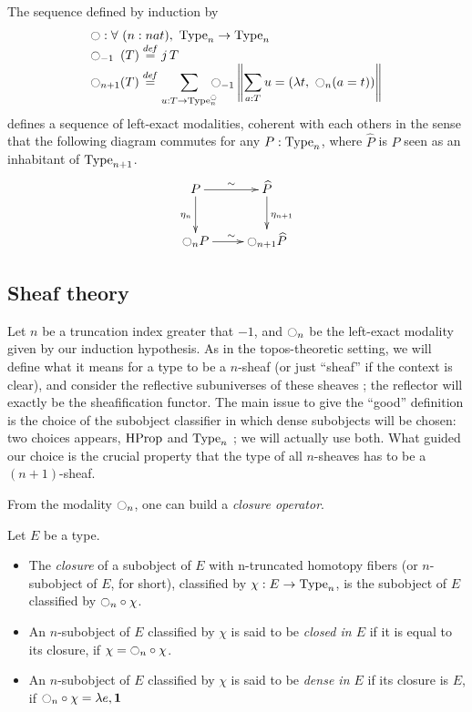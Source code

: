 \begin{thm}\label{thm:main}
  The sequence defined by induction by
  \[ \begin{array}{l}
   \ocircle : \forall \ (n : nat), \ \operatorname{Type}_n \to \operatorname{Type}_n 
   \\
    \ocircle_{-1\phantom{n}}(T) \overset{de\hspace{-0.2ex}f}{=} \mathop{j} T \\

      \displaystyle{\ensuremath{\ocircle}_{n+1}(T)} \overset{de\hspace{-0.2ex}f}{=}  
      \displaystyle{\sum_{u:T \to \operatorname{Type}_n^{\ensuremath{\ocircle}}} \!\!\!\!\ensuremath{\ocircle}_{-1} 
      \left\|
      \sum_{a:T} u= (\lambda t,~\ensuremath{\ocircle}_n (a=t))
      \right\|}
    \end{array}
\]
defines a sequence of left-exact modalities, coherent with each others
in the sense that the following diagram commutes for any $P:\operatorname{Type}_n$,
where $\hat P$ is $P$ seen as an inhabitant of $\operatorname{Type}_{n+1}$.
\[ \xymatrix{
    P \ar@{->}^{\sim}[r] \ar[d]_{\eta_{n}} & \widehat P \ar[d]^{\eta_{n+1}} \\
    \modal_{n} P \ar@{->}^{\sim}[r] & \modal_{n+1} \widehat P 
  } \]
\end{thm}

\subsection{Sheaf theory}
\label{ssec:sheaves}

Let $n$ be a truncation index greater that $-1$, and $\ocircle_n$ be the
left-exact modality given by our induction hypothesis. As in the
topos-theoretic setting, we will define what it means for a type to be
a $n$-sheaf (or just ``sheaf'' if the context is clear), and consider
the reflective subuniverses of these sheaves ; the reflector will
exactly be the sheafification functor.
The main issue to give the ``good'' definition is the choice of the
subobject classifier in which dense subobjects will be chosen: two
choices appears, $\operatorname{HProp}$ and $\operatorname{Type}_n$ ; we will actually use
both. What guided our choice is the crucial property that the type of
all $n$-sheaves has to be a $(n+1)$-sheaf.

From the modality $\ocircle_n$, one can build a {\em closure operator}.

\begin{defi}
  Let $E$ be a type. 
  \begin{itemize}

  \item The {\em closure} of a subobject of $E$ with
  n-truncated homotopy fibers (or $n$-subobject of $E$, for short),
  classified by $\chi : E \to \operatorname{Type}_n$, is the subobject of $E$
  classified by $\ocircle_n \circ \chi$.

  
\item An $n$-subobject of $E$ classified by $\chi$ is said to be {\em
    closed in $E$} if it is equal to its closure, \ie{} if
  $\chi = \ocircle_n \circ \chi$.

  
\item An $n$-subobject of $E$ classified by $\chi$ is said to be {\em
    dense in $E$} if its closure is $E$, \ie{} if 
  $\ocircle_n \circ \chi = \lambda e, \mathbf{1}$ 
  \end{itemize}
\end{defi}


